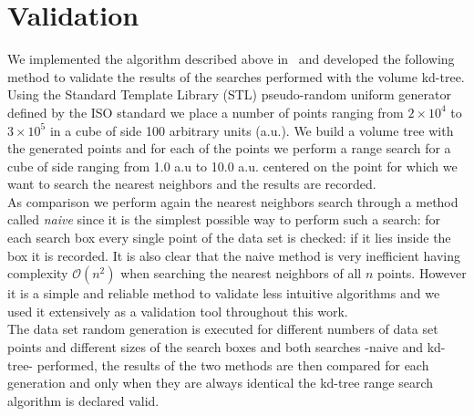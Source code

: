 \section{Validation}\label{sec:volume_kdtree_validation}
We implemented the algorithm described above in \CC\ and developed the following method to validate the results of the searches performed with the volume kd-tree.\\
Using the Standard Template Library (STL) pseudo-random uniform generator defined by the  ISO standard we place a number of points ranging from $2 \times 10^{4}$ to $3 \times 10^{5}$ in a cube of side 100 arbitrary units (a.u.). We build a volume tree with the generated points and for each of the points we perform a range search for a cube of side ranging from 1.0 a.u to 10.0 a.u. centered on the point for which we want to search the nearest neighbors and the results are recorded.\\
As comparison we perform again the nearest neighbors search through a method called \textit{naive} since it is the simplest possible way to perform such a search: for each search box every single point of the data set is checked: if it lies inside the box it is recorded. It is also clear that the naive method is very inefficient having complexity $\mathcal{O}(n^{2})$ when searching the nearest neighbors of all $n$ points. However it is a simple and reliable method to validate less intuitive algorithms and we used it extensively as a validation tool throughout this work.\\
The data set random generation is executed for different numbers of data set points and different sizes of the search boxes and both searches -naive and kd-tree- performed, the results of the two methods are then compared for each generation and only when they are always identical the kd-tree range search algorithm is declared valid.

